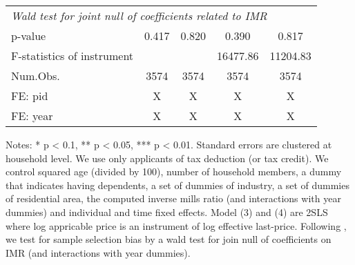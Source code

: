 \begin{table}
\begin{threeparttable}
\begin{tabular}[t]{lcccc}
\multicolumn{5}{l}{\textit{Wald test for joint null of coefficients related to IMR}}\\
\hspace{1em}p-value & 0.417 & 0.820 & 0.390 & 0.817\\
F-statistics of instrument &  &  & 16477.86 & 11204.83\\
Num.Obs. & \num{3574} & \num{3574} & \num{3574} & \num{3574}\\
FE: pid & X & X & X & X\\
FE: year & X & X & X & X\\
\bottomrule
\end{tabular}
\begin{tablenotes}
\item Notes: * p < 0.1, ** p < 0.05, *** p < 0.01. Standard errors are clustered at household level. We use only applicants of tax deduction (or tax credit). We control squared age (divided by 100), number of household members, a dummy that indicates having dependents, a set of dummies of industry, a set of dummies of residential area, the computed inverse mills ratio (and interactions with year dummies) and individual and time fixed effects. Model (3) and (4) are 2SLS where log appricable price is an instrument of log effective last-price. Following \cite{Semykina2010}, we test for sample selection bias by a wald test for join null of coefficients on IMR (and interactions with year dummies).
\end{tablenotes}
\end{threeparttable}
\end{table}
